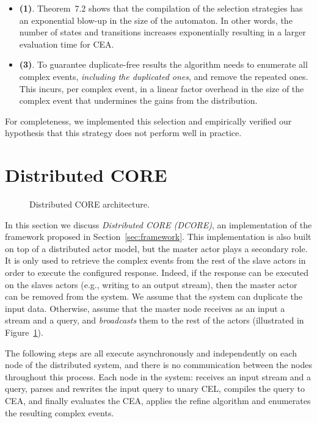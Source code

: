 \begin{itemize}
  \item[] \textbf{(1)}. Theorem~7.2 \cite{formal-framework-cer} shows that the compilation of the selection strategies has an exponential blow-up in the size of the automaton. In other words, the number of states and transitions increases exponentially resulting in a larger evaluation time for CEA.

  \item[] \textbf{(3)}. To guarantee duplicate-free results the algorithm needs to enumerate all complex events, \emph{including the duplicated ones}, and remove the repeated ones. This incurs, per complex event, in a linear factor overhead in the size of the complex event that undermines the gains from the distribution.
\end{itemize}

For completeness, we implemented this selection and empirically verified our hypothesis that this strategy does not perform well in practice.

\section{Distributed CORE}\label{sec:dcore}

\begin{figure}[H]
  \centering
  \caption{Distributed CORE architecture.}
  \label{fig:dcore}
\end{figure}

In this section we discuss \emph{Distributed CORE (DCORE)}, an implementation of the framework proposed in Section~\ref{sec:framework}. This implementation is also built on top of a distributed actor model, but the master actor plays a secondary role. It is only used to retrieve the complex events from the rest of the slave actors in order to execute the configured response. Indeed, if the response can be executed on the slaves actors (e.g., writing to an output stream), then the master actor can be removed from the system. We assume that the system can duplicate the input data. Otherwise, assume that the master node receives as an input a stream and a query, and \emph{broadcasts} them to the rest of the actors (illustrated in Figure~\ref{fig:dcore}).

The following steps are all execute asynchronously and independently on each node of the distributed system, and there is no communication between the nodes throughout this process. Each node in the system: receives an input stream and a query, parses and rewrites the input query to unary CEL, compiles the query to CEA, and finally evaluates the CEA, applies the refine algorithm and enumerates the resulting complex events.

